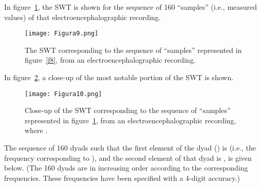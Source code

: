 \documentclass[11pt]{rMTA2010} \usepackage[utf8]{inputenc} \usepackage{graphicx} \usepackage{booktabs} \usepackage{array} \usepackage{enumerate}
\begin{document}
\vspace{8mm}


In figure~\ref{f9}, the SWT is shown for the sequence of 160 ``samples'' (i.e., measured values) of that electroencephalographic recording.

\begin{figure}[H]
\centering
\texttt{[image: Figura9.png]}
\caption{The SWT corresponding to the sequence of ``samples'' represented in figure~\ref{f8}, from an electroencephalographic recording.}
\label{f9}
\end{figure}

In figure~\ref{f11}, a close-up of the most notable portion of the SWT is shown.

\begin{figure}[H]
\centering
\texttt{[image: Figura10.png]}
\caption{Close-up of the SWT corresponding to the sequence of ``samples'' represented in figure~\ref{f9}, from an electroencephalographic recording, where .}
\label{f11}
\end{figure}



The sequence of 160 dyads such that the first element of the  dyad () is  (i.e., the frequency corresponding to ), and the second element of that dyad is , is given below. (The 160 dyads are in increasing order according to the corresponding frequencies. These frequencies have been specified with a 4-digit accuracy.)

\vspace{4mm}
\end{document}

